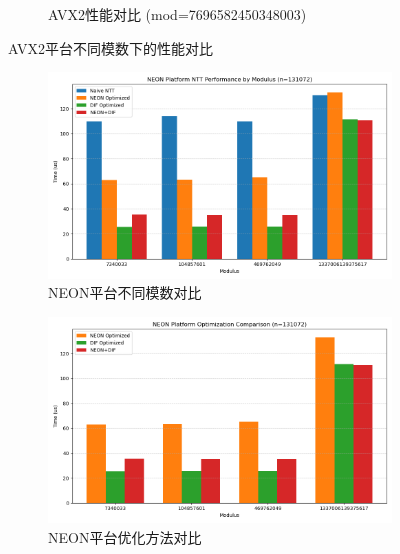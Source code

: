 \documentclass[a4paper,colorlinks=true,linkcolor=blue,urlcolor=blue,citecolor=green,bookmarks=true]{article}
\begin{document}
\begin{figure}[H]
\begin{subfigure}[b]{0.32\textwidth}
    \caption{AVX2性能对比 (mod=7696582450348003)}
    \label{fig:avx2_7696582450348003}
  \end{subfigure}
  \caption{AVX2平台不同模数下的性能对比}
  \label{fig:avx2_performance}
\end{figure}

\begin{figure}[H]
  \centering
  \begin{subfigure}[b]{0.32\textwidth}
    \centering
    \includegraphics[width=\textwidth]{neon_modulus_comparison.png}
    \caption{NEON平台不同模数对比}
    \label{fig:neon_modulus}
  \end{subfigure}
  \hfill
  \begin{subfigure}[b]{0.32\textwidth}
    \centering
    \includegraphics[width=\textwidth]{neon_optimization_comparison.png}
    \caption{NEON平台优化方法对比}
    \label{fig:neon_optimization}
  \end{subfigure}
  \hfill
  \begin{subfigure}[b]{0.32\textwidth}
    \centering

\end{subfigure}
\end{figure}
\end{document}
